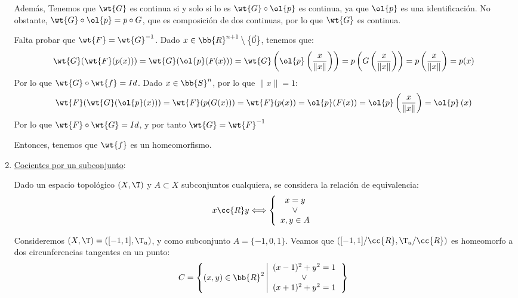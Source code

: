 \begin{ejemplo}
\begin{enumerate}
        Además, Tenemos que $\wt{G}$ es continua si y solo si lo es $\wt{G}\circ \ol{p}$ es continua, ya que $\ol{p}$ es una identificación. No obstante, $\wt{G}\circ \ol{p} = p\circ G$, que es composición de dos continuas, por lo que $\wt{G}$ es continua.

        Falta probar que $\wt{F}=\wt{G}^{-1}$. Dado $x\in \bb{R}^{n+1}\setminus\left\{\vec{0}\right\}$, tenemos que:
        \begin{equation*}
            \wt{G}(\wt{F}(p(x))) = \wt{G}(\ol{p}(F(x))) = \wt{G}\left(\ol{p}\left(\frac{x}{\|x\|}\right)\right) = p\left(G\left(\frac{x}{\|x\|}\right)\right) = p\left(\frac{x}{\|x\|}\right) = p(x)
        \end{equation*}
        Por lo que $\wt{G}\circ \wt{f}=Id$. Dado $x\in \bb{S}^n$, por lo que $\|x\|=1$:
        \begin{equation*}
            \wt{F}(\wt{G}(\ol{p}(x))) = \wt{F}(p(G(x))) = \wt{F}(p(x)) = \ol{p}(F(x)) = \ol{p}\left(\frac{x}{\|x\|}\right)
            = \ol{p}\left(x\right)
        \end{equation*}
        Por lo que $\wt{F}\circ \wt{G}=Id$, y por tanto $\wt{G}=\wt{F}^{-1}$

        Entonces, tenemos que $\wt{f}$ es un homeomorfismo.
        
        \item \ul{Cocientes por un subconjunto}:

        Dado un espacio topológico $(X,\T)$ y $A\subset X$ subconjuntos cualquiera, se considera la relación de equivalencia:
        \begin{equation*}
            x\cc{R}y \Longleftrightarrow \left\{
            \begin{array}{c}
                x=y \\ \lor \\ x,y\in A
            \end{array}
            \right.
        \end{equation*}

        Consideremos $(X,\T)=([-1,1],\T_u)$, y como subconjunto $A=\{-1,0,1\}$. Veamos que $([-1,1]/\cc{R},\T_u/\cc{R})$ es homeomorfo a dos circunferencias tangentes en un punto:
        \begin{equation*}
            C = \left\{(x,y)\in \bb{R}^2\left|
                \begin{array}{c}
                    (x-1)^2 + y^2=1 \\ \lor \\
                    (x+1)^2 + y^2 = 1
                \end{array}
            \right.\right\}
        \end{equation*}
        \begin{figure}[H]
            \centering
\end{figure}
\end{enumerate}
\end{ejemplo}
